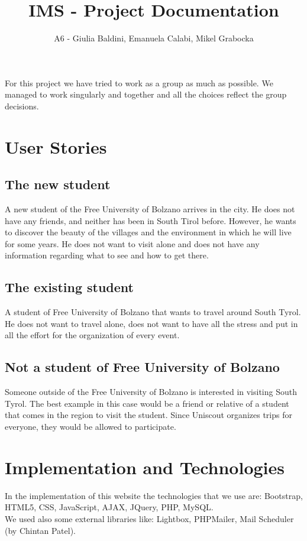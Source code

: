 \documentclass[a4paper]{article}
\title{IMS - Project Documentation}
\author{A6 - Giulia Baldini, Emanuela Calabi, Mikel Grabocka}
\begin{document}
	\maketitle
	
	\noindent For this project we have tried to work as a group as much as possible. We managed to work singularly and together and all the choices reflect the group decisions.
	
	\section{User Stories}
	\subsection{The new student}
	A new student of the Free University of Bolzano arrives in the city. He does not have any friends, and neither has been in South Tirol before. However, he wants to discover the beauty of the villages and the environment in which he will live for some years. He does not want to visit alone and does not have any information regarding what to see and how to get there.
	\subsection{The existing student }
	A student of Free University of Bolzano that wants to travel around South Tyrol. He does not want to travel alone, does not want to have all the stress and put in all the effort for the organization of every event.
	\subsection{Not a student of Free University of Bolzano}
	Someone outside of the Free University of Bolzano is interested in visiting South Tyrol. The best example in this case would be a friend or relative of a student that comes in the region to visit the student. Since Uniscout organizes trips for everyone, they would be allowed to participate.
	
	\section{Implementation and Technologies}	
	In the implementation of this website the technologies that we use are: Bootstrap, HTML5, CSS, JavaScript, AJAX, JQuery, PHP, MySQL.\\
	We used also some external libraries like: Lightbox, PHPMailer, Mail Scheduler (by Chintan Patel).
\end{document}
